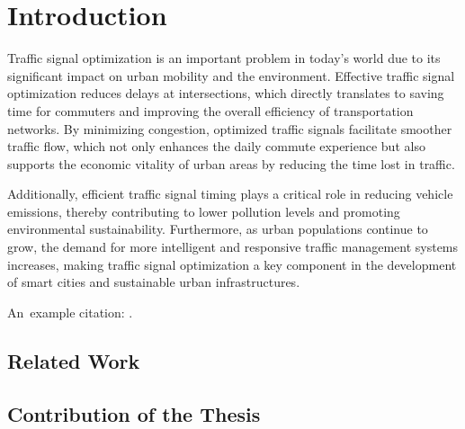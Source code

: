 \chapter*{Introduction}

%
%
%
%

Traffic signal optimization is an important problem in today's world due to its
significant impact on urban mobility and the environment. Effective traffic
signal optimization reduces delays at intersections, which directly translates
to saving time for commuters and improving the overall efficiency of
transportation networks. By minimizing congestion, optimized traffic signals
facilitate smoother traffic flow, which not only enhances the daily commute
experience but also supports the economic vitality of urban areas by reducing
the time lost in traffic.

Additionally, efficient traffic signal timing plays a
critical role in reducing vehicle emissions, thereby contributing to lower
pollution levels and promoting environmental sustainability. Furthermore, as
urban populations continue to grow, the demand for more intelligent and
responsive traffic management systems increases, making traffic signal
optimization a key component in the development of smart cities and sustainable
urban infrastructures.

An~example citation: \cite{google2023google} \cite{rodrigues2023principled} \cite{li2022building} \cite{russell2020artificial}.

\section*{Related Work} \label{sec:related_work}

\section*{Contribution of the Thesis} \label{sec:contribution_of_the_thesis}
